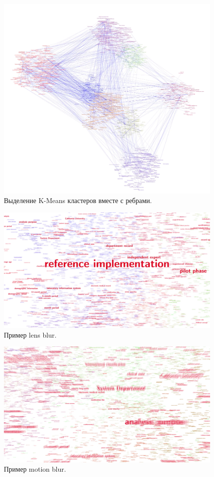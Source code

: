 \begin{figure}[h]
  \centering
  \includegraphics[width=\textwidth]{shots/clusters.png}
  \caption{Выделение K-Means кластеров вместе с ребрами.}
\end{figure}

\begin{figure}[h]
  \centering
  \includegraphics[width=\textwidth]{shots/lens.png}
  \caption{Пример lens blur.}
\end{figure}

\begin{figure}[h]
  \centering
  \includegraphics[width=\textwidth]{shots/motion.png}
  \caption{Пример motion blur.}
\end{figure}




  
